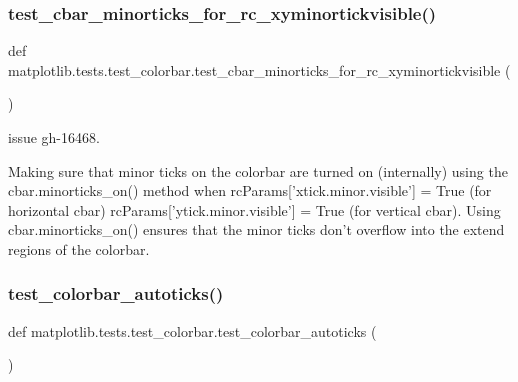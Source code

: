 \subsubsection{\texorpdfstring{test\+\_\+cbar\+\_\+minorticks\+\_\+for\+\_\+rc\+\_\+xyminortickvisible()}{test\_cbar\_minorticks\_for\_rc\_xyminortickvisible()}}
{\footnotesize\ttfamily def matplotlib.\+tests.\+test\+\_\+colorbar.\+test\+\_\+cbar\+\_\+minorticks\+\_\+for\+\_\+rc\+\_\+xyminortickvisible (\begin{DoxyParamCaption}{ }\end{DoxyParamCaption})}

\begin{DoxyVerb}issue gh-16468.

Making sure that minor ticks on the colorbar are turned on
(internally) using the cbar.minorticks_on() method when
rcParams['xtick.minor.visible'] = True (for horizontal cbar)
rcParams['ytick.minor.visible'] = True (for vertical cbar).
Using cbar.minorticks_on() ensures that the minor ticks
don't overflow into the extend regions of the colorbar.
\end{DoxyVerb}
 \mbox{\label{namespacematplotlib_1_1tests_1_1test__colorbar_aa2b6d66df5e0bb3f80596efbea83192d}} 
\subsubsection{\texorpdfstring{test\+\_\+colorbar\+\_\+autoticks()}{test\_colorbar\_autoticks()}}
{\footnotesize\ttfamily def matplotlib.\+tests.\+test\+\_\+colorbar.\+test\+\_\+colorbar\+\_\+autoticks (\begin{DoxyParamCaption}{ }\end{DoxyParamCaption})}

\mbox{\label{namespacematplotlib_1_1tests_1_1test__colorbar_a62976ddcb685fc269ba350c3162721e1}} 
